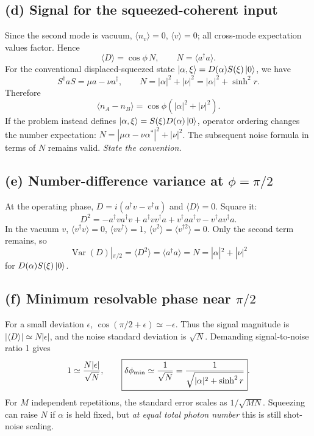 \subsection*{(d) Signal for the squeezed-coherent input}
Since the second mode is vacuum,
\(\langle n_v\rangle=0\),
\(\langle v\rangle=0\); all cross-mode
expectation values factor. Hence
\[
\boxed{\langle D\rangle=\cos\phi\,N},
\qquad N=\langle a^\dagger a\rangle.
\]
For the conventional displaced-squeezed
state \(\left\lvert \alpha,\xi\right\rangle=D(\alpha)S(\xi)\left\lvert 0\right\rangle\),
we have
\[
S^\dagger a S=\mu a-\nu a^\dagger,\qquad
\boxed{N=|\alpha|^2+|\nu|^2
=|\alpha|^2+\sinh^2 r}.
\]
Therefore
\[
\boxed{\langle n_A-n_B\rangle
=\cos\phi(|\alpha|^2+|\nu|^2)}.
\]
If the problem instead defines
\(\left\lvert \alpha,\xi\right\rangle=S(\xi)D(\alpha)\left\lvert 0\right\rangle\),
operator ordering changes the number expectation:
\(N=|\mu\alpha-\nu\alpha^*|^2+|\nu|^2\).
The subsequent noise formula in terms of \(N\)
remains valid. \emph{State the convention.}

\subsection*{(e) Number-difference variance at \(\phi=\pi/2\)}
At the operating phase,
\(D=i(a^\dagger v-v^\dagger a)\) and
\(\langle D\rangle=0\). Square it:
\[
D^2=-a^\dagger v a^\dagger v
+a^\dagger v v^\dagger a
+v^\dagger a a^\dagger v
-v^\dagger a v^\dagger a.
\]
In the vacuum \(v\),
\(\langle v^\dagger v\rangle=0\),
\(\langle vv^\dagger\rangle=1\),
\(\langle v^2\rangle=\langle v^{\dagger2}\rangle=0\).
Only the second term remains, so
\[
\boxed{\operatorname{Var}(D)|_{\pi/2}
=\langle D^2\rangle
=\langle a^\dagger a\rangle=N
=|\alpha|^2+|\nu|^2}
\]
for \(D(\alpha)S(\xi)\left\lvert 0\right\rangle\).

\subsection*{(f) Minimum resolvable phase near \(\pi/2\)}
For a small deviation \(\epsilon\),
\(\cos(\pi/2+\epsilon)\simeq-\epsilon\).
Thus the signal magnitude is
\(|\langle D\rangle|\simeq N|\epsilon|\),
and the noise standard deviation is \(\sqrt N\).
Demanding signal-to-noise ratio 1 gives
\[
1\simeq\frac{N|\epsilon|}{\sqrt N},
\qquad
\boxed{\delta\phi_{\rm min}\simeq\frac1{\sqrt N}
=\frac1{\sqrt{|\alpha|^2+\sinh^2 r}}}.
\]
For \(M\) independent repetitions,
the standard error scales as \(1/\sqrt{MN}\).
Squeezing can raise \(N\) if \(\alpha\) is
held fixed, but \emph{at equal total photon
number} this is still shot-noise scaling.
